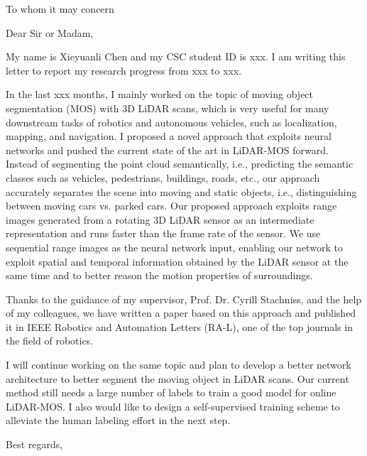 \documentclass[english]{briefcd_3en}
\begin{document}
\begin{letter}{To whom it may concern}
\date{March 15, 2022}
\opening{Dear Sir or Madam,}

My name is Xieyuanli Chen and my CSC student ID is xxx. I am writing this letter to report my research progress from xxx to xxx.

In the last xxx months, I mainly worked on the topic of moving object segmentation (MOS) with 3D LiDAR scans, which is very useful for many downstream tasks of robotics and autonomous vehicles, such as localization, mapping, and navigation. I proposed a novel approach that exploits neural networks and pushed the current state of the art in LiDAR-MOS forward. Instead of segmenting the point cloud semantically, i.e., predicting the semantic classes such as vehicles, pedestrians, buildings, roads, etc., our approach accurately separates the scene into moving and static objects, i.e., distinguishing between moving cars vs. parked cars. Our proposed approach exploits range images generated from a rotating 3D LiDAR sensor as an intermediate representation and runs faster than the frame rate of the sensor. We use sequential range images as the neural network input, enabling our network to exploit spatial and temporal information obtained by the LiDAR sensor at the same time and to better reason the motion properties of surroundings.

Thanks to the guidance of my supervisor, Prof. Dr. Cyrill Stachniss, and the help of my colleagues, we have written a paper based on this approach and published it in IEEE Robotics and Automation Letters (RA-L), one of the top journals in the field of robotics.

I will continue working on the same topic and plan to develop a better network architecture to better segment the moving object in LiDAR scans. Our current method still needs a large number of labels to train a good model for online LiDAR-MOS. I also would like to design a self-supervised training scheme to alleviate the human labeling effort in the next step.


\closing{Best regards,}

\end{letter}
\end{document}
